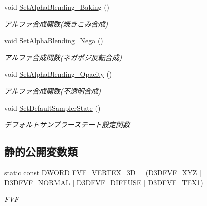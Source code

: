 \begin{DoxyCompactItemize}
void \mbox{\hyperlink{class_renderer_direct_x9_a083f55d941075227189769fd9807ffd1}{Set\+Alpha\+Blending\+\_\+\+Baking}} ()
\begin{DoxyCompactList}\small\item\em アルファ合成関数(焼きこみ合成) \end{DoxyCompactList}\item 
void \mbox{\hyperlink{class_renderer_direct_x9_a5018efa829bf845405ac70beef7df947}{Set\+Alpha\+Blending\+\_\+\+Nega}} ()
\begin{DoxyCompactList}\small\item\em アルファ合成関数(ネガポジ反転合成) \end{DoxyCompactList}\item 
void \mbox{\hyperlink{class_renderer_direct_x9_a789206ba211e9cbffe0bfe4c7dfb7457}{Set\+Alpha\+Blending\+\_\+\+Opacity}} ()
\begin{DoxyCompactList}\small\item\em アルファ合成関数(不透明合成) \end{DoxyCompactList}\item 
void \mbox{\hyperlink{class_renderer_direct_x9_a229cd266427d96486c43d2e63300e438}{Set\+Default\+Sampler\+State}} ()
\begin{DoxyCompactList}\small\item\em デフォルトサンプラーステート設定関数 \end{DoxyCompactList}\end{DoxyCompactItemize}
\subsection*{静的公開変数類}
\begin{DoxyCompactItemize}
\item 
static const D\+W\+O\+RD \mbox{\hyperlink{class_renderer_direct_x9_a80ce0089b01354986332553353625da6}{F\+V\+F\+\_\+\+V\+E\+R\+T\+E\+X\+\_\+3D}} = (D3\+D\+F\+V\+F\+\_\+\+X\+YZ $\vert$ D3\+D\+F\+V\+F\+\_\+\+N\+O\+R\+M\+AL $\vert$ D3\+D\+F\+V\+F\+\_\+\+D\+I\+F\+F\+U\+SE $\vert$ D3\+D\+F\+V\+F\+\_\+\+T\+E\+X1)
\begin{DoxyCompactList}\small\item\em F\+VF \end{DoxyCompactList}\end{DoxyCompactItemize}
